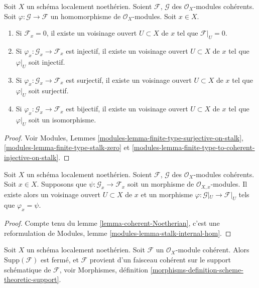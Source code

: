 \begin{lemma}
\label{lemma-local-isomorphism}
Soit $X$ un schéma localement noethérien.
Soient $\mathcal{F}$, $\mathcal{G}$ des $\mathcal{O}_X$-modules cohérents.
Soit $\varphi : \mathcal{G} \to \mathcal{F}$ un homomorphisme
de $\mathcal{O}_X$-modules. Soit $x \in X$.
\begin{enumerate}
\item Si $\mathcal{F}_x = 0$, il existe un voisinage ouvert
$U \subset X$ de $x$ tel que $\mathcal{F}|_U = 0$.
\item Si $\varphi_x : \mathcal{G}_x \to \mathcal{F}_x$ est injectif,
il existe un voisinage ouvert $U \subset X$ de $x$ tel que
$\varphi|_U$ soit injectif.
\item Si $\varphi_x : \mathcal{G}_x \to \mathcal{F}_x$ est surjectif,
il existe un voisinage ouvert $U \subset X$ de $x$ tel que
$\varphi|_U$ soit surjectif.
\item Si $\varphi_x : \mathcal{G}_x \to \mathcal{F}_x$ est bijectif,
il existe un voisinage ouvert $U \subset X$ de $x$ tel que
$\varphi|_U$ soit un isomorphisme.
\end{enumerate}
\end{lemma}

\begin{proof}
Voir Modules, Lemmes
\ref{modules-lemma-finite-type-surjective-on-stalk},
\ref{modules-lemma-finite-type-stalk-zero} et
\ref{modules-lemma-finite-type-to-coherent-injective-on-stalk}.
\end{proof}

\begin{lemma}
\label{lemma-map-stalks-local-map}
Soit $X$ un schéma localement noethérien.
Soient $\mathcal{F}$, $\mathcal{G}$ des $\mathcal{O}_X$-modules cohérents.
Soit $x \in X$. Supposons
que $\psi : \mathcal{G}_x \to \mathcal{F}_x$ soit un morphisme de
$\mathcal{O}_{X, x}$-modules.
Il existe alors un voisinage ouvert $U \subset X$ de $x$ et un morphisme
$\varphi : \mathcal{G}|_U \to \mathcal{F}|_U$ tels que
$\varphi_x = \psi$.
\end{lemma}

\begin{proof}
Compte tenu du lemme \ref{lemma-coherent-Noetherian},
c'est une reformulation de
Modules, lemme \ref{modules-lemma-stalk-internal-hom}.
\end{proof}

\begin{lemma}
\label{lemma-coherent-support-closed}
Soit $X$ un schéma localement noethérien. Soit $\mathcal{F}$ un
$\mathcal{O}_X$-module cohérent. Alors $\text{Supp}(\mathcal{F})$ est fermé, et
$\mathcal{F}$ provient d'un faisceau cohérent sur le support schématique
de $\mathcal{F}$, voir
Morphismes, définition \ref{morphisms-definition-scheme-theoretic-support}.
\end{lemma}

